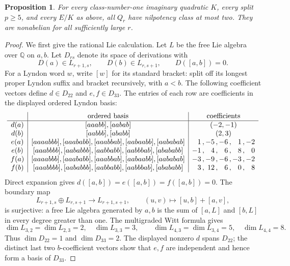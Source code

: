 \documentclass[11pt]{article}
\newtheorem{proposition}[theorem]{Proposition}
\theoremstyle{definition}\newtheorem{definition}[theorem]{Definition}
\begin{document}
\begin{proposition}\label{prop:cm-small-nonabelian-image}
For every class-number-one imaginary quadratic \(K\), every
split \(p\geq5\), and every \(E/K\) as above, all \(Q_r\) have
nilpotency class at most two.  They are nonabelian for all
sufficiently large \(r\).
\end{proposition}

\begin{proof}
We first give the rational Lie calculation.
Let \(L\) be the free Lie algebra over \(\mathbb Q\) on \(a,b\).
Let \(D_{rs}\) denote its space of derivations with
\[
 D(a)\in L_{r+1,s},\qquad D(b)\in L_{r,s+1},\qquad
                         D([a,b])=0.
\]
For a Lyndon word \(w\), write \([w]\) for its standard bracket:
split off its longest proper Lyndon suffix and bracket
recursively, with \(a<b\).
The following coefficient vectors define \(d\in D_{22}\) and
\(e,f\in D_{33}\).  The entries of each row are coefficients in
the displayed ordered Lyndon basis:
\[
\begin{array}{c|c|r@{\,,\,}r@{\,,\,}r@{\,,\,}r@{\,,\,}r}
 &\text{ordered basis}&\multicolumn{5}{c}{\text{coefficients}}\\ \hline
d(a)&[aaabb],[aabab]&\multicolumn{5}{c}{(-2,-1)}\\
d(b)&[aabbb],[ababb]&\multicolumn{5}{c}{(2,3)}\\
e(a)&[aaaabbb],[aaababb],[aaabbab],[aabaabb],[aababab]
       &1&-5&-6&1&-2\\
e(b)&[aaabbbb],[aababbb],[aabbabb],[aabbbab],[abababb]
       &-1&4&6&8&0\\
f(a)&[aaaabbb],[aaababb],[aaabbab],[aabaabb],[aababab]
       &-3&-9&-6&-3&-2\\
f(b)&[aaabbbb],[aababbb],[aabbabb],[aabbbab],[abababb]
       &3&12&6&0&8
\end{array}
\]
Direct expansion gives
\(d([a,b])=e([a,b])=f([a,b])=0\).
The boundary map
\[
 L_{r+1,s}\oplus L_{r,s+1}\longrightarrow L_{r+1,s+1},
 \qquad (u,v)\longmapsto[u,b]+[a,v],
\]
is surjective: a free Lie algebra generated by \(a,b\) is the
sum of \([a,L]\) and \([b,L]\) in every degree greater than one.
The multigraded Witt formula gives
\[
 \dim L_{3,2}=\dim L_{2,3}=2,\quad \dim L_{3,3}=3,
 \qquad
 \dim L_{4,3}=\dim L_{3,4}=5,\quad \dim L_{4,4}=8.
\]
Thus \(\dim D_{22}=1\) and \(\dim D_{33}=2\).
The displayed nonzero \(d\) spans \(D_{22}\);
the distinct last two \(b\)-coefficient vectors show that \(e,f\)
are independent and hence form a basis of \(D_{33}\).


\end{proof}
\end{document}

